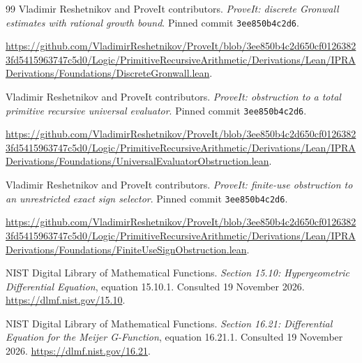 \begin{thebibliography}{99}
 Vladimir Reshetnikov and ProveIt contributors. \emph{ProveIt: discrete Gronwall estimates with rational growth bound}. Pinned commit \nolinkurl{3ee850b4c2d6}.

\url{https://github.com/VladimirReshetnikov/ProveIt/blob/3ee850b4c2d650cf01263823fd5415963747c5d0/Logic/PrimitiveRecursiveArithmetic/Derivations/Lean/IPRADerivations/Foundations/DiscreteGronwall.lean}.

 Vladimir Reshetnikov and ProveIt contributors. \emph{ProveIt: obstruction to a total primitive recursive universal evaluator}. Pinned commit \nolinkurl{3ee850b4c2d6}.

\url{https://github.com/VladimirReshetnikov/ProveIt/blob/3ee850b4c2d650cf01263823fd5415963747c5d0/Logic/PrimitiveRecursiveArithmetic/Derivations/Lean/IPRADerivations/Foundations/UniversalEvaluatorObstruction.lean}.

 Vladimir Reshetnikov and ProveIt contributors. \emph{ProveIt: finite-use obstruction to an unrestricted exact sign selector}. Pinned commit \nolinkurl{3ee850b4c2d6}.

\url{https://github.com/VladimirReshetnikov/ProveIt/blob/3ee850b4c2d650cf01263823fd5415963747c5d0/Logic/PrimitiveRecursiveArithmetic/Derivations/Lean/IPRADerivations/Foundations/FiniteUseSignObstruction.lean}.

 NIST Digital Library of Mathematical Functions. \emph{Section 15.10: Hypergeometric Differential Equation}, equation 15.10.1. Consulted 19 November 2026. \url{https://dlmf.nist.gov/15.10}.

 NIST Digital Library of Mathematical Functions. \emph{Section 16.21: Differential Equation for the Meijer G-Function}, equation 16.21.1. Consulted 19 November 2026. \url{https://dlmf.nist.gov/16.21}.

\end{thebibliography}
